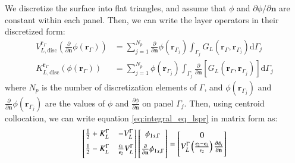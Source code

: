 We discretize the surface into flat triangles, and assume that  $\phi$ and 
$\partial \phi/\partial \mathbf{n}$ are constant within each panel. Then, we can
write the layer operators in their discretized form:
%
\begin{align} \label{eq:layers_disc}
V_{L,\text{disc}}^{\mathbf{r}_\Gamma} \left( \frac{\partial}{\partial \mathbf{n}} \phi(\mathbf{r}_{\Gamma}) \right) &= \sum_{j=1}^{N_p} \frac{\partial}{\partial \mathbf{n}} \phi(\mathbf{r}_{\Gamma_j}) \int_{\Gamma_j} G_L(\mathbf{r}_\Gamma,\mathbf{r}_{\Gamma_j})  \mathrm{d} \Gamma_j  \nonumber \\
K_{L,\text{disc}}^{\mathbf{r}_\Gamma}(\phi(\mathbf{r}_{\Gamma})) &=  \sum_{j=1}^{N_p}\phi(\mathbf{r}_{\Gamma_j})\int_{\Gamma_j} \frac{\partial}{\partial \mathbf{n}} \left[ G_L(\mathbf{r}_\Gamma,\mathbf{r}_{\Gamma_j}) \right]\mathrm{d} \Gamma_j
\end{align}
%
\noindent where $N_p$ is the number of discretization elements of $\Gamma$, 
and $\phi(\mathbf{r}_{\Gamma_j})$ and $\frac{\partial}{\partial \mathbf{n}} 
\phi(\mathbf{r}_{\Gamma_j})$ are the values of $\phi$ and 
$\frac{\partial \phi}{\partial \mathbf{n}}$ on panel $\Gamma_j$.
Then, using centroid collocation, we can write equation \eqref{eq:integral_eq_lspr} in matrix form as:
%
 \begin{equation} \label{eq:matrix_lspr}
 \left[
    \begin{matrix} 
       \frac{1}{2} + K_{L}^{\Gamma} & -V_{L}^{\Gamma}  \vspace{0.2cm} \\
       \frac{1}{2} - K_{L}^{\Gamma} &  \frac{\epsilon_1}{\epsilon_2} V_{L}^{\Gamma}  \vspace{0.2cm} 
    \end{matrix}
    \right] \left[ 
    \begin{matrix} 
       \phi_{1s,\Gamma} \vspace{0.2cm} \\
       \frac{\partial}{\partial \mathbf{n}} \phi_{1s,\Gamma} \vspace{0.2cm}
    \end{matrix} 
     \right] =   
    \left[
    \begin{matrix} 
       0 \\
       V_{L}^{\Gamma} \left(\frac{\epsilon_2-\epsilon_1}{\epsilon_2}\right) \frac{\partial\phi_i}{\partial\mathbf{n}} \vspace{0.2cm} 
    \end{matrix}
    \right]
 \end{equation}
%

